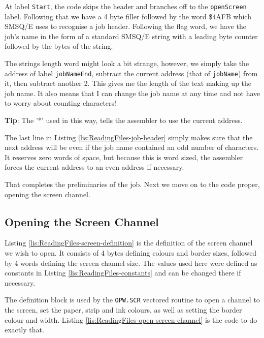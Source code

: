 At label \texttt{Start}, the code skips the header and branches off
to the \texttt{openScreen} label. Following that we have a 4 byte
filler followed by the word \$4AFB which SMSQ/E uses to recognise
a job header. Following the flag word, we have the job's name in the
form of a standard SMSQ/E string with a leading byte counter followed
by the bytes of the string.

The strings length word might look a bit strange, however, we simply
take the address of label \texttt{jobNameEnd}, subtract the current
address (that of \texttt{jobName}) from it, then subtract another
2. This gives me the length of the text making up the job name. It
also means that I can change the job name at any time and not have
to worry about counting characters!

\textbf{Tip}: The '{*}' used in this way, tells the assembler to use
the current address.

The last line in Listing \ref{lis:ReadingFiles-job-header} simply
makes sure that the next address will be even if the job name contained
an odd number of characters. It reserves zero words of space, but
because this is word sized, the assembler forces the current address
to an even address if necessary.

That completes the preliminaries of the job. Next we move on to the
code proper, opening the screen channel.

\subsection{Opening the Screen Channel}

Listing \ref{lis:ReadingFiles-screen-definition} is the definition
of the screen channel we wish to open. It consists of 4 bytes defining
colours and border sizes, followed by 4 words defining the screen
channel size. The values used here were defined as constants in Listing
\ref{lis:ReadingFiles-constants} and can be changed there if necessary.



The definition block is used by the \texttt{OPW.SCR} vectored routine
to open a channel to the screen, set the paper, strip and ink colours,
as well as setting the border colour and width. Listing \ref{lis:ReadingFiles-open-screen-channel}
is the code to do exactly that.

